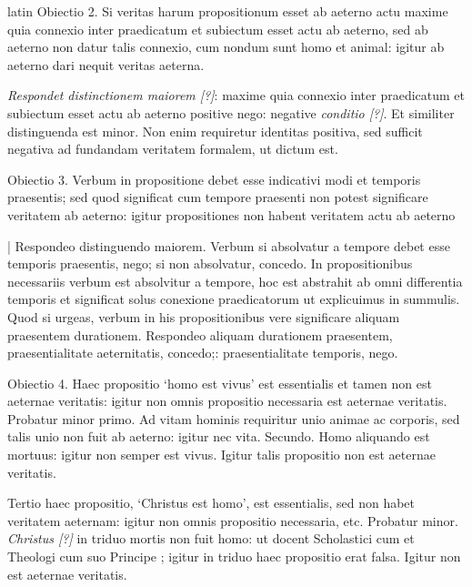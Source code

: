 \begin{otherlanguage*}{latin}
\pstart
Obiectio 2. Si veritas harum propositionum esset ab aeterno actu maxime quia connexio inter praedicatum et subiectum esset actu ab aeterno, sed ab aeterno non datur talis connexio, cum nondum sunt homo et animal:
igitur ab aeterno dari nequit veritas aeterna. 
\pend

\pstart
\emph{Respondet distinctionem maiorem [?]}:
maxime quia connexio inter praedicatum et subiectum esset actu ab aeterno positive nego:
negative \emph{conditio [?]}. Et similiter distinguenda est minor. Non enim requiretur identitas positiva, sed sufficit negativa ad fundandam veritatem formalem, ut dictum est. 
\pend

\pstart
Obiectio 3. Verbum in propositione debet esse indicativi modi et temporis praesentis; sed quod significat cum tempore praesenti non potest significare veritatem ab aeterno:
igitur propositiones non habent veritatem actu ab aeterno 
\pend

\pstart
\textnormal{|} Respondeo distinguendo maiorem. Verbum si absolvatur a tempore debet esse temporis praesentis, nego; si non absolvatur, concedo. In propositionibus necessariis verbum est absolvitur a tempore, hoc est abstrahit ab omni differentia temporis et significat solus conexione praedicatorum ut explicuimus in summulis. Quod si urgeas, verbum in his propositionibus vere significare aliquam praesentem durationem. Respondeo aliquam durationem praesentem, praesentialitate aeternitatis, concedo;:
praesentialitate temporis, nego. 
\pend

\pstart
Obiectio 4. Haec propositio `homo est vivus' est essentialis et tamen non est aeternae veritatis:
igitur non omnis propositio necessaria est aeternae veritatis. Probatur minor primo. Ad vitam hominis requiritur unio animae ac corporis, sed talis unio non fuit ab aeterno:
igitur nec vita. Secundo. Homo aliquando est mortuus:
igitur non semper est vivus. Igitur talis propositio non est aeternae veritatis. 
\pend

\pstart
Tertio haec propositio, `Christus est homo', est essentialis, sed non habet veritatem aeternam:
igitur non omnis propositio necessaria, etc. Probatur minor. \emph{Christus [?]} in triduo mortis non fuit homo:
ut docent Scholastici cum  et Theologi cum suo Principe ; igitur in triduo haec propositio erat falsa. Igitur non est aeternae veritatis. 
\pend


\end{otherlanguage*}
